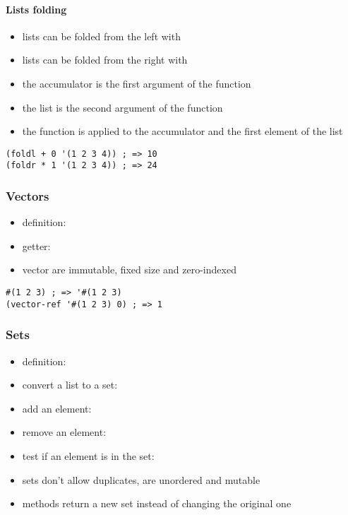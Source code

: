 \documentclass[a4paper,landscape,10pt]{article}
\begin{document}
\begin{multicols*}{2}
  \paragraph{Lists folding}

  \begin{itemize}
    \item lists can be folded from the left with 
    \item lists can be folded from the right with 
    \item the accumulator is the first argument of the function
    \item the list is the second argument of the function
    \item the function is applied to the accumulator and the first element of the list
  \end{itemize}

  \begin{lstlisting}[language=Racket]
(foldl + 0 '(1 2 3 4)) ; => 10
(foldr * 1 '(1 2 3 4)) ; => 24
  \end{lstlisting}

  \subsubsection{Vectors}

  \begin{itemize}
    \item definition: 
    \item getter: 
    \item vector are immutable, fixed size and zero-indexed
  \end{itemize}

  \begin{lstlisting}[language=Racket]
#(1 2 3) ; => '#(1 2 3)
(vector-ref '#(1 2 3) 0) ; => 1
  \end{lstlisting}

  \subsubsection{Sets}

  \begin{itemize}
    \item definition: 
    \item convert a list to a set: 
    \item add an element: 
    \item remove an element: 
    \item test if an element is in the set: 
    \item sets don't allow duplicates, are unordered and mutable
    \item methods return a new set instead of changing the original one
  \end{itemize}


\end{multicols*}
\end{document}
